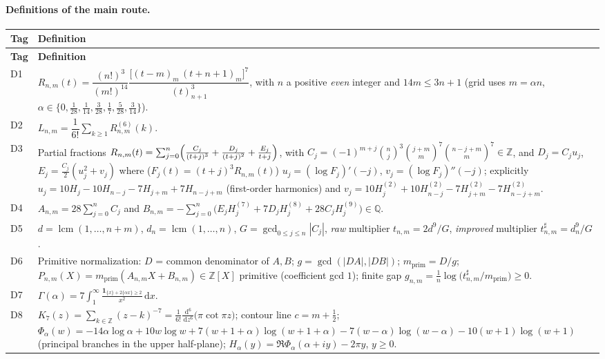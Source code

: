 \documentclass[11pt]{article}
\newcommand{\Z}{\mathbb{Z}}
\newcommand{\Q}{\mathbb{Q}}
\newcommand{\dd}{\,\mathrm{d}}
\DeclareMathOperator{\lcm}{lcm}
\begin{document}
\paragraph{Definitions of the main route.}
\begin{longtable}{@{}p{}p{}@{}}
\toprule
\textbf{Tag} & \textbf{Definition} \\
\midrule
\endfirsthead
\toprule \textbf{Tag} & \textbf{Definition} \\ \midrule
\endhead
D1 & $R_{n,m}(t)=\dfrac{(n!)^3}{(m!)^{14}}\dfrac{\bigl[(t-m)_m\,(t+n+1)_m\bigr]^{7}}{(t)_{n+1}^{3}}$,
      with $n$ a positive \emph{even} integer and $14m\le 3n+1$ (grid uses $m=\alpha n$,
      $\alpha\in\{0,\tfrac1{28},\tfrac1{14},\tfrac3{28},\tfrac17,\tfrac5{28},\tfrac3{14}\}$). \\
D2 & $L_{n,m}=\dfrac{1}{6!}\sum_{k\ge1}R^{(6)}_{n,m}(k)$. \\
D3 & Partial fractions
      $R_{n,m}(t)=\sum_{j=0}^{n}\Bigl(\frac{C_j}{(t+j)^3}+\frac{D_j}{(t+j)^2}+\frac{E_j}{t+j}\Bigr)$,
      with $C_j=(-1)^{m+j}\binom{n}{j}^{3}\binom{j+m}{m}^{7}\binom{n-j+m}{m}^{7}\in\Z$, and
      $D_j=C_ju_j$, $E_j=\tfrac{C_j}{2}(u_j^2+v_j)$ where ($F_j(t)=(t+j)^3R_{n,m}(t)$)
      $u_j=(\log F_j)'(-j)$, $v_j=(\log F_j)''(-j)$; explicitly
      $u_j=10H_j-10H_{n-j}-7H_{j+m}+7H_{n-j+m}$ (first-order harmonics) and
      $v_j=10H_j^{(2)}+10H_{n-j}^{(2)}-7H_{j+m}^{(2)}-7H_{n-j+m}^{(2)}$. \\
D4 & $A_{n,m}=28\sum_{j=0}^n C_j$ and
      $B_{n,m}=-\sum_{j=0}^{n}\bigl(E_jH_j^{(7)}+7D_jH_j^{(8)}+28C_jH_j^{(9)}\bigr)\in\Q$. \\
D5 & $d=\lcm(1,\dots,n+m)$, $d_n=\lcm(1,\dots,n)$, $G=\gcd_{0\le j\le n}|C_j|$,
      \emph{raw} multiplier $t_{n,m}=2d^{9}/G$, \emph{improved} multiplier $t^{\sharp}_{n,m}=d_n^{9}/G$. \\
D6 & Primitive normalization: $D$ = common denominator of $A,B$; $g=\gcd(|DA|,|DB|)$;
      $m_{\mathrm{prim}}=D/g$; $P_{n,m}(X)=m_{\mathrm{prim}}(A_{n,m}X+B_{n,m})\in\Z[X]$ primitive
      (coefficient gcd $1$); finite gap $g_{n,m}=\tfrac1n\log\bigl(t^{\sharp}_{n,m}/m_{\mathrm{prim}}\bigr)\ge0$. \\
D7 & $\Gamma(\alpha)=7\displaystyle\int_{1}^{\infty}\frac{\mathbf 1_{\{x\}+2\{\alpha x\}\ge2}}{x^{2}}\dd x$. \\
D8 & $K_7(z)=\sum_{k\in\Z}(z-k)^{-7}=\tfrac{1}{6!}\frac{\dd^{6}}{\dd z^{6}}\bigl(\pi\cot\pi z\bigr)$;
      contour line $c=m+\tfrac12$;
      $\Phi_\alpha(w)=-14\alpha\log\alpha+10w\log w+7(w{+}1{+}\alpha)\log(w{+}1{+}\alpha)
      -7(w{-}\alpha)\log(w{-}\alpha)-10(w{+}1)\log(w{+}1)$ (principal branches in the upper half-plane);
      $H_\alpha(y)=\Re\Phi_\alpha(\alpha+iy)-2\pi y$, $y\ge0$. \\
\bottomrule
\end{longtable}
\end{document}
